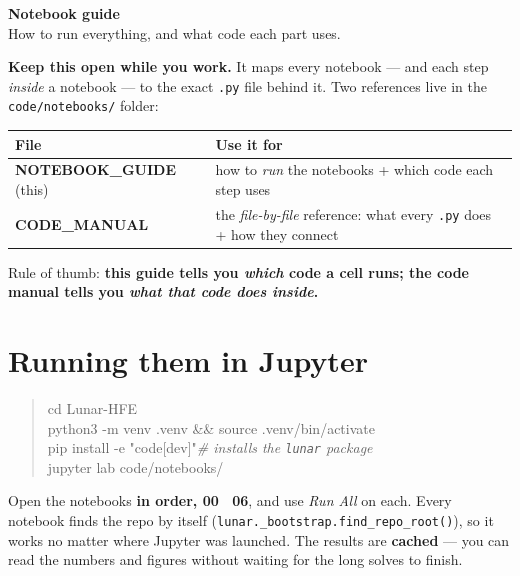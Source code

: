 \documentclass[11pt]{article}
\newcommand{\code}[1]{\texttt{\small #1}}
\newcommand{\fn}[1]{\texttt{\small\color{coral}#1}}
\newcommand{\arr}{\textrightarrow}
\begin{document}
\sloppy

\begin{center}
  {\LARGE\bfseries\color{char} Notebook guide}\\[3pt]
  {\color{dimc} How to run everything, and what code each part uses.}
\end{center}
\vspace{2pt}

\noindent
\textbf{Keep this open while you work.} It maps every notebook --- and each step
\emph{inside} a notebook --- to the exact \code{.py} file behind it. Two
references live in the \code{code/notebooks/} folder:

\begin{center}\small
\begin{tabular}{@{}ll@{}}
\toprule
File & Use it for \\
\midrule
\textbf{NOTEBOOK\_GUIDE} (this) & how to \emph{run} the notebooks + which code each step uses \\
\textbf{CODE\_MANUAL} & the \emph{file-by-file} reference: what every \code{.py} does + how they connect \\
\bottomrule
\end{tabular}
\end{center}

\noindent
Rule of thumb: \textbf{this guide tells you \emph{which} code a cell runs; the
code manual tells you \emph{what that code does inside}.}

\section{Running them in Jupyter}

\begin{quote}\ttfamily\small
cd Lunar-HFE\\
python3 -m venv .venv \&\& source .venv/bin/activate\\
pip install -e "code[dev]"\hfill\textrm{\itshape\# installs the \code{lunar} package}\\
jupyter lab code/notebooks/
\end{quote}

Open the notebooks \textbf{in order, 00 \arr\ 06}, and use \emph{Run All} on
each. Every notebook finds the repo by itself
(\fn{lunar.\_bootstrap.find\_repo\_root()}), so it works no matter where Jupyter
was launched. The results are \textbf{cached} --- you can read the numbers and
figures without waiting for the long solves to finish.
\end{document}
